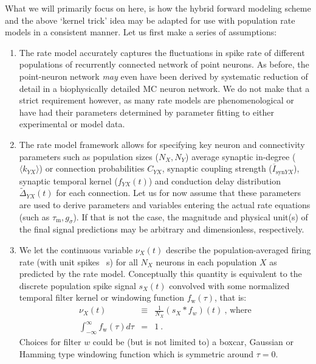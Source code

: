 What we will primarily focus on here,
is how the hybrid forward modeling scheme and the above `kernel trick' idea may be adapted for use with population rate models in a consistent manner.
Let us first make a series of assumptions:
\begin{enumerate}
\item The rate model accurately captures the fluctuations in spike rate of different populations of recurrently connected network of point neurons.
As before, the point-neuron network \textit{may} even have been derived by systematic reduction of detail in a biophysically detailed MC neuron network.
We do not make that a strict requirement however,
as many rate models are phenomenological or have had their parameters determined by parameter fitting to either experimental or model data.

\item The rate model framework allows for specifying key neuron and connectivity parameters such as
population sizes ($N_X, N_Y$) average synaptic in-degree ($\langle k_{YX} \rangle$) or connection probabilities $C_{YX}$,
synaptic coupling strength ($\overline{I}_{\text{syn}YX}$),
synaptic temporal kernel ($f_{YX}(t)$) and
conduction delay distribution $\widetilde{\Delta}_{YX}(t)$ for each connection.
Let us for now assume that these parameters are used to derive parameters and variables entering the actual rate equations (such as $\tau_\text{m}, g_\sigma$).
If that is not the case, the magnitude and physical unit(s) of the final signal predictions may be arbitrary and dimensionless, respectively.

\item We let the continuous variable $\nu_X(t)$ describe the population-averaged firing rate (with unit spikes \si{\per\second}) for all $N_X$ neurons in each population $X$ as predicted by the rate model.
Conceptually this quantity is equivalent to the discrete population spike signal $s_X(t)$ convolved with some normalized temporal filter kernel or windowing function $f_\text{w}(\tau)$, that is:
\begin{eqnarray}
\nu_X(t) &\equiv& \frac{1}{N_X} \left(s_X \ast f_w \right)(t)~\text{, where} \\
\int_{-\infty}^\infty f_\text{w}(\tau) d\tau &=& 1 ~.
\end{eqnarray}
Choices for filter $w$ could be (but is not limited to) a boxcar, Gaussian or Hamming type windowing function which is symmetric around $\tau = 0$.

\end{enumerate}

